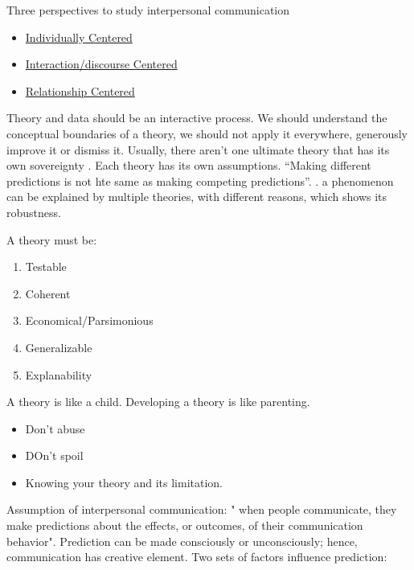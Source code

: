 \documentclass[
]{book}
\providecommand{\tightlist}{%
  \setlength{\itemsep}{0pt}\setlength{\parskip}{0pt}}
\begin{document}
Three perspectives to study interpersonal communication \citep{Baxter_2008}

\begin{itemize}
\tightlist
\item
  \protect\hyperlink{individually-centered}{Individually Centered}\\
\item
  \protect\hyperlink{interactiondiscourse-centered}{Interaction/discourse Centered}\\
\item
  \protect\hyperlink{relationship-centered}{Relationship Centered}
\end{itemize}

Theory and data should be an interactive process. We should understand the conceptual boundaries of a theory, we should not apply it everywhere, generously improve it or dismiss it. Usually, there aren't one ultimate theory that has its own sovereignty \citep{Higgins_2004}. Each theory has its own assumptions. ``Making different predictions is not hte same as making competing predictions''. \citep{Higgins_2004}. a phenomenon can be explained by multiple theories, with different reasons, which shows its robustness.

A theory must be:

\begin{enumerate}
\def\labelenumi{\arabic{enumi}.}
\tightlist
\item
  Testable\\
\item
  Coherent\\
\item
  Economical/Parsimonious\\
\item
  Generalizable\\
\item
  Explanability
\end{enumerate}

A theory is like a child. Developing a theory is like parenting.

\begin{itemize}
\tightlist
\item
  Don't abuse\\
\item
  DOn't spoil\\
\item
  Knowing your theory and its limitation.
\end{itemize}

\citep[pp.~5-30]{miller1995} Assumption of interpersonal communication: " when people communicate, they make predictions about the effects, or outcomes, of their communication behavior". Prediction can be made consciously or unconsciously; hence, communication has creative element. Two sets of factors influence prediction:
\end{document}
